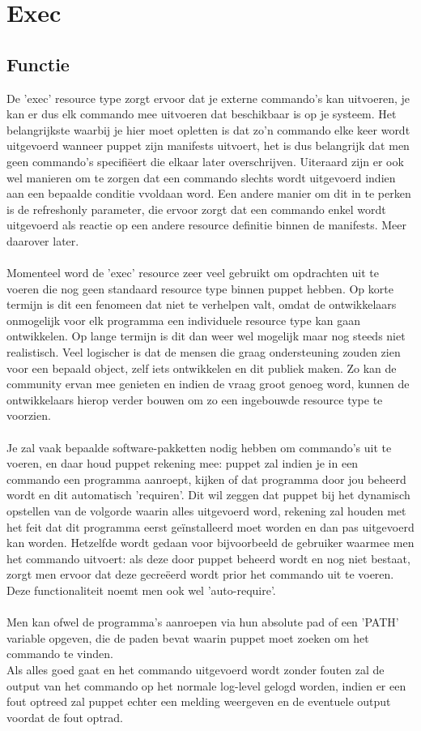 \section{Exec}
\subsection{Functie}
De 'exec' resource type zorgt ervoor dat je externe commando's kan uitvoeren, je kan er dus elk commando mee uitvoeren dat beschikbaar is op je systeem. Het belangrijkste waarbij je hier moet opletten is dat zo'n commando elke keer wordt uitgevoerd wanneer puppet zijn manifests uitvoert, het is dus belangrijk dat men geen commando's specifi\"{e}ert die elkaar later overschrijven. Uiteraard zijn er ook wel manieren om te zorgen dat een commando slechts wordt uitgevoerd indien aan een bepaalde conditie vvoldaan word. Een andere manier om dit in te perken is de refreshonly parameter, die ervoor zorgt dat een commando enkel wordt uitgevoerd als reactie op een andere resource definitie binnen de manifests. Meer daarover later.\\\\
%
Momenteel word de 'exec' resource zeer veel gebruikt om opdrachten uit te voeren die nog geen standaard resource type binnen puppet hebben. Op korte termijn is dit een fenomeen dat niet te verhelpen valt, omdat de ontwikkelaars onmogelijk voor elk programma een individuele resource type kan gaan ontwikkelen. Op lange termijn is dit dan weer wel mogelijk maar nog steeds niet realistisch. Veel logischer is dat de mensen die graag ondersteuning zouden zien voor een bepaald object, zelf iets ontwikkelen en dit publiek maken. Zo kan de community ervan mee genieten en indien de vraag groot genoeg word, kunnen de ontwikkelaars hierop verder bouwen om zo een ingebouwde resource type te voorzien.\\\\
%
Je zal vaak bepaalde software-pakketten nodig hebben om commando's uit te voeren, en daar houd puppet rekening mee: puppet zal indien je in een commando een programma aanroept, kijken of dat programma door jou beheerd wordt en dit automatisch 'requiren'. Dit wil zeggen dat puppet bij het dynamisch opstellen van de volgorde waarin alles uitgevoerd word, rekening zal houden met het feit dat dit programma eerst ge\"installeerd moet worden en dan pas uitgevoerd kan worden. Hetzelfde wordt gedaan voor bijvoorbeeld de gebruiker waarmee men het commando uitvoert: als deze door puppet beheerd wordt en nog niet bestaat, zorgt men ervoor dat deze gecre\"{e}erd wordt prior het commando uit te voeren. Deze functionaliteit noemt men ook wel 'auto-require'.\\\\
%
Men kan ofwel de programma's aanroepen via hun absolute pad of een 'PATH' variable opgeven, die de paden bevat waarin puppet moet zoeken om het commando te vinden.\\
Als alles goed gaat en het commando uitgevoerd wordt zonder fouten zal de output van het commando op het normale log-level gelogd worden, indien er een fout optreed zal puppet echter een melding weergeven en de eventuele output voordat de fout optrad.\\
%
